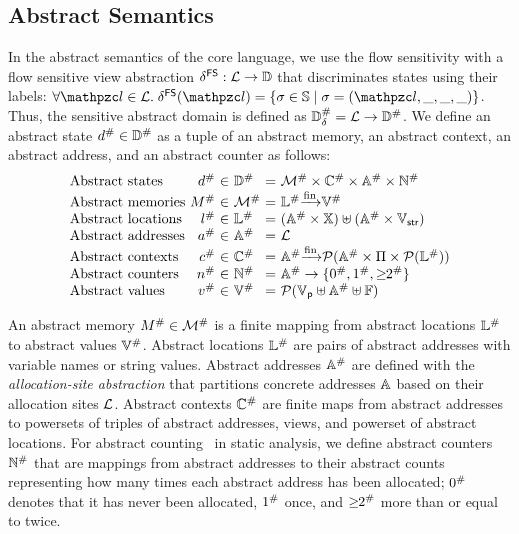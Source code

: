 \subsection{Abstract Semantics}
In the abstract semantics of the core language, we use the flow sensitivity with a
flow sensitive view abstraction $\delta^{\textsf{FS}}: \mathcal{L} \rightarrow \mathbb{D}$ that
discriminates states using their labels: $\forall \lab \in \labset. \;
\fsviewmap(\lab) = \{ \st \in \stset \mid \st = (\lab, \_, \_, \_) \}$. Thus, the
sensitive abstract domain is defined as ${\mathbb{D}}^{\#}_\delta = \mathcal{L} \rightarrow
{\mathbb{D}}^{\#}$.  We define an abstract state ${d}^{\#} \in {\mathbb{D}}^{\#}$ as a tuple of an
abstract memory, an abstract context, an abstract address, and an
abstract counter as follows:
\[
  \begin{array}{l@{~}r@{~}c@{~}l@{~}c@{~}l}
\text{Abstract states} & \abselem &\in& \absdom &=& \absmemset \times \absctxtset
\times \absaddrset \times \abscountset\\
\text{Abstract memories} & \absmem &\in& \absmemset &=& \abslocset \finmap
\absvalset\\
\text{Abstract locations} & \absloc &\in& \abslocset &=& (\absaddrset \times
\varset) \uplus (\absaddrset \times \strset)\\
\text{Abstract addresses} & \absaddr &\in& \absaddrset &=& \labset\\
\text{Abstract contexts} & \absctxt &\in& \absctxtset &=& \absaddrset \finmap
\powerset{\absaddrset \times \viewset \times \powerset{\abslocset}}\\
\text{Abstract counters} & \abscount &\in& \abscountset &=& \absaddrset
\rightarrow \{ \abszero, \absone, \absmany \}\\
\text{Abstract values} & \absval &\in& \absvalset &=& \powerset{\pvalset
\uplus \absaddrset \uplus \fvalset}\\
  \end{array}
\]

An abstract memory ${M}^{\#} \in {\mathcal{M}}^{\#}$ is a finite mapping from abstract
locations ${\mathbb{L}}^{\#}$ to abstract values ${\mathbb{V}}^{\#}$.  Abstract locations
${\mathbb{L}}^{\#}$ are pairs of abstract addresses with variable names or string
values. Abstract addresses ${\mathbb{A}}^{\#}$ are defined with the
\textit{allocation-site abstraction} that partitions concrete addresses
$\mathbb{A}$ based on their allocation sites $\mathcal{L}$.  Abstract contexts
${\mathbb{C}}^{\#}$ are finite maps from abstract addresses to powersets of triples of
abstract addresses, views, and powerset of abstract locations.  For abstract
counting~\cite{abstract-gc-counting, revisit-recency} in static analysis, we
define abstract counters ${\mathbb{N}}^{\#}$ that are mappings from abstract addresses to
their abstract counts representing how many times each abstract address has been
allocated; ${0}^{\#}$ denotes that it has never been allocated, ${1}^{\#}$ once,
and ${\geq\!\!2}^{\#}$ more than or equal to twice.

